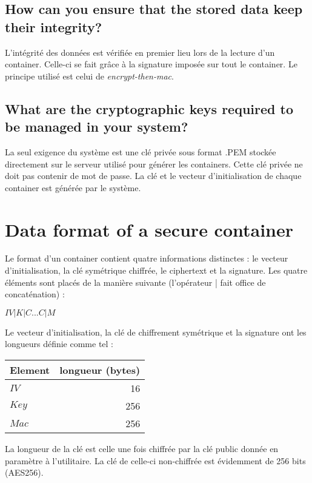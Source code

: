 \documentclass[a4paper]{report}
\begin{document}
\subsection{How can you ensure that the stored data keep their integrity?}
L'intégrité des données est vérifiée en premier lieu lors de la lecture d'un container. Celle-ci se fait grâce à la signature imposée sur tout le container. Le principe utilisé est celui de \textit{encrypt-then-mac}.

\subsection{What are the cryptographic keys required to be managed in your system?}
La seul exigence du système est une clé privée sous format .PEM stockée directement sur le serveur utilisé pour générer les containers. Cette clé privée ne doit pas contenir de mot de passe. La clé et le vecteur d'initialisation de chaque container est générée par le système.

\newpage
\section{Data format of a secure container}
Le format d'un container contient quatre informations distinctes : le vecteur d'initialisation, la clé symétrique chiffrée, le ciphertext et la signature. Les quatre éléments sont placés de la manière suivante (l'opérateur | fait office de concaténation) :

\begin{center}
$IV|K|C...C|M$
\end{center}

Le vecteur d'initialisation, la clé de chiffrement symétrique et la signature ont les longueurs définie comme tel :

\begin{center}
\begin{tabular}{|l|r|}
    \hline
    Element & longueur (bytes) \\
    \hline
    $IV$ & 16\\
    $Key$ & 256\\
    $Mac$ & 256\\
    \hline
\end{tabular}
\end{center}

La longueur de la clé est celle une fois chiffrée par la clé public donnée en paramètre à l'utilitaire. La clé de celle-ci non-chiffrée est évidemment de 256 bits (AES256).
\end{document}
